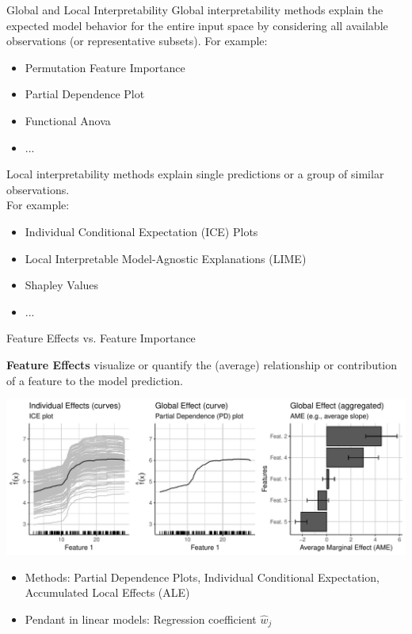 \documentclass[11pt,compress,t,notes=noshow, xcolor=table]{beamer}
\begin{document}
\begin{vbframe}{Global and Local Interpretability}
	Global interpretability methods explain the expected model behavior for the entire input space by considering all available observations (or representative subsets). For example:
	\begin{itemize}
		\item Permutation Feature Importance
		\item Partial Dependence Plot
		\item Functional Anova
		\item ...
	\end{itemize}
	
	Local interpretability methods explain single predictions or a group of similar observations.\\ For example:
	\begin{itemize}
		\item Individual Conditional Expectation (ICE) Plots
		\item Local Interpretable Model-Agnostic Explanations (LIME)
		\item Shapley Values
		\item ...
	\end{itemize}
\end{vbframe}

\begin{vbframe}{Feature Effects vs. Feature Importance}
	
	\textbf{Feature Effects} visualize or quantify the (average) relationship or contribution of a feature to the model prediction.
	\begin{center}
		\includegraphics[page=1, width=\textwidth]{figure/feature-effects}
	\end{center}
	\begin{itemize}
		\item Methods: Partial Dependence Plots, Individual Conditional Expectation,\\ Accumulated Local Effects (ALE)
		\item Pendant in linear models: Regression coefficient $\hat{w}_j$
	\end{itemize}
\end{vbframe}
\end{document}
